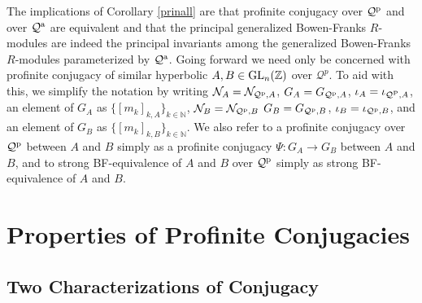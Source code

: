 \documentclass{amsart}
\theoremstyle{plain}
\theoremstyle{definition}
\theoremstyle{remark}
\begin{document}
The implications of Corollary \ref{prinall} are that profinite conjugacy over ${\mathcal Q}^{\rm p}$ and over ${\mathcal Q}^{\rm a}$ are equivalent and that the principal generalized Bowen-Franks $R$-modules are indeed the principal invariants among the generalized Bowen-Franks $R$-modules parameterized by ${\mathcal Q}^{\rm a}$. Going forward we need only be concerned with profinite conjugacy of similar hyperbolic $A,B\in {\rm GL}_n({\mathbb Z})$ over ${\mathcal Q}^p$. To aid with this, we simplify the notation by writing ${\mathcal N}_A = {\mathcal N}_{ {\mathcal Q}^{\rm p},A}$, $G_A = G_{ {\mathcal Q}^{\rm p},A}$, $\iota_A = \iota_{ {\mathcal Q}^{\rm P},A}$, an element of $G_A$ as $\{ [m_k]_{k,A}\}_{k\in {\mathbb N}}$, ${\mathcal N}_B = {\mathcal N}_{ {\mathcal Q}^{\rm p},B}$ $G_B = G_{ {\mathcal Q}^{\rm p},B}$, $\iota_B = \iota_{ {\mathcal Q}^{\rm p},B}$, and an element of $G_B$ as $\{ [m_k]_{k,B}\}_{ k\in {\mathbb N}}$. We also refer to a profinite conjugacy over ${\mathcal Q}^{\rm p}$ between $A$ and $B$ simply as a profinite conjugacy $\Psi:G_A\to G_B$ between $A$ and $B$, and to strong {\rm BF}-equivalence of $A$ and $B$ over ${\mathcal Q}^{\rm p}$ simply as strong {\rm BF}-equivalence of $A$ and $B$.



\section{Properties of Profinite Conjugacies} 

\subsection{Two Characterizations of Conjugacy}
\end{document}
